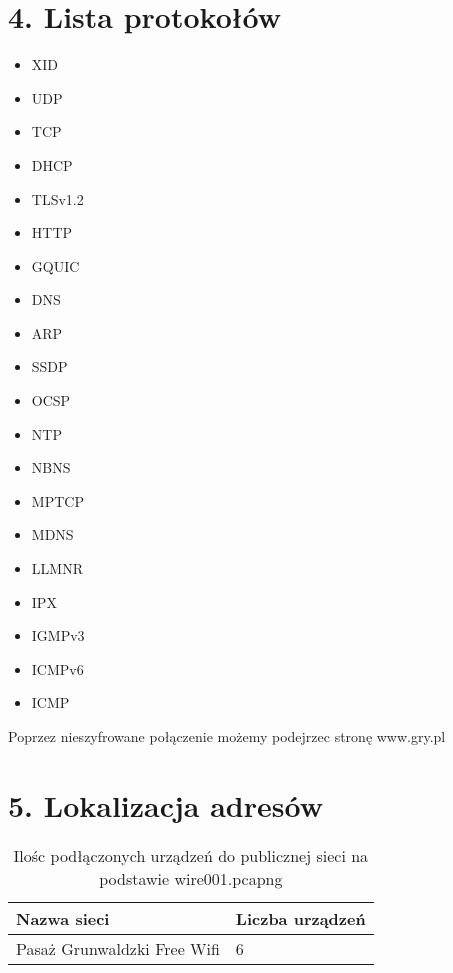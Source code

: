 \documentclass[12pt, a4paper]{article}
\begin{document}
\section*{4. Lista protokołów}
\begin{multicols}{2}
    \begin{itemize}
        \item XID
        \item UDP
        \item TCP
        \item DHCP
        \item TLSv1.2
        \item HTTP
        \item GQUIC
        \item DNS
        \item ARP
        \item SSDP
        \item OCSP
        \item NTP
        \item NBNS
        \item MPTCP
        \item MDNS
        \item LLMNR
        \item IPX
        \item IGMPv3
        \item ICMPv6
        \item ICMP
    \end{itemize}
\end{multicols}
\vspace{5mm}
Poprzez nieszyfrowane połączenie możemy podejrzec stronę www.gry.pl

\section*{5. Lokalizacja adresów}
\begin{table}[h]
    \centering
    \footnotesize
    \begin{tabular}{l | l}
        Nazwa sieci & Liczba urządzeń \\ \hline
        Pasaż Grunwaldzki Free Wifi & 6 \\
        \end{tabular}
    \caption{Ilośc podłączonych urządzeń do publicznej sieci na podstawie wire001.pcapng}
\end{table}
\end{document}

